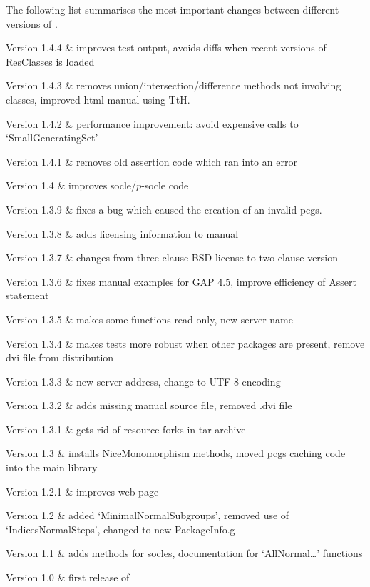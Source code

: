
The following list summarises the most important changes between different versions of \CRISP.

\beginitems
Version  1.4.4 &
	improves test output, avoids diffs when recent versions of ResClasses is loaded

Version 1.4.3 &
	removes union/intersection/difference methods not involving classes, improved html manual using TtH.

Version 1.4.2 & 
	performance improvement: avoid expensive calls to `SmallGeneratingSet'
	
Version 1.4.1 &
	removes old assertion code which ran into an error
	
Version 1.4 &
	improves socle/$p$-socle code
	
Version 1.3.9 &
	fixes a bug which caused the creation of an invalid pcgs.
	
Version 1.3.8 &
	adds licensing information to manual
	
Version 1.3.7 &
	changes from three clause BSD license to two clause version
	
Version 1.3.6 & 
	fixes manual examples for GAP 4.5, improve efficiency of Assert statement
	
Version 1.3.5 &
	makes some functions read-only, new server name
	
Version 1.3.4 & 
	makes tests more robust when other packages are present, remove dvi file from distribution
	
Version 1.3.3 &	
	new server address, change to UTF-8 encoding
	
Version 1.3.2 &
	adds missing manual source file, removed .dvi file
	
Version 1.3.1 & 
	gets rid of resource forks in tar archive
	
Version 1.3	&
	installs NiceMonomorphism methods, moved pcgs caching code into the main {\GAP} library
	
Version 1.2.1	&
	improves web page
	
Version 1.2	&
	added `MinimalNormalSubgroups', removed use of `IndicesNormalSteps', changed to new PackageInfo.g 

Version 1.1 	& 
	adds methods for socles, documentation for `AllNormal\dots' functions
	
Version 1.0	&
	first release of {\CRISP}
	
\enditems


